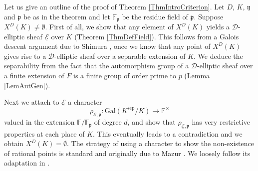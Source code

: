 \documentclass[10pt]{amsart}
\theoremstyle{plain}
\theoremstyle{definition}
\newcommand{\Gal}{\mathrm{Gal}}
\newcommand{\sep}{\mathrm{sep}}
\newcommand{\ucE}{\underline{\mathcal{E}}}
\newcommand{\bF}{\mathbb{F}}
\newcommand{\sD}{\mathscr{D}}
\newcommand{\frp}{\mathfrak{p}}
\newcommand{\fry}{\mathfrak{y}}
\begin{document}

Let us give an outline of the proof of Theorem \ref{ThmIntroCriterion}. 
Let $D$, $K$, $\fry$ and $\frp$ be as in the theorem and let $\bF_\frp$ be the residue field of $\frp$.
Suppose $X^D(K)\neq \emptyset$. 
First of all, we show that 
any element of $X^D(K)$ yields a $\sD$-elliptic sheaf $\ucE$ over $K$ (Theorem 
\ref{ThmDefField}). 
This follows from a Galois descent argument due to Shimura \cite{Shimura}, 
once we know that any point of $X^D(K)$ gives rise to a $\sD$-elliptic sheaf 
over a separable extension of $K$. 
We deduce the separability from the fact that the automorphism group of a 
$\sD$-elliptic sheaf over a finite extension of $F$ is a finite group of order 
prime to $p$ 
(Lemma \ref{LemAutGen}).

Next we attach to $\ucE$ a character 
\[
\rho_{\ucE,\frp}:\Gal(K^\sep/K)\to \bF^\times
\]
valued in the extension $\bF/\bF_\frp$ of degree $d$, and show that $\rho_{\ucE,\frp}$ has very restrictive properties at 
each place
of $K$. This eventually leads to a contradiction and we obtain 
$X^D(K)=\emptyset$. The strategy of using a character to show the non-existence 
of rational points is 
standard and originally due to Mazur \cite{Mazur}. We loosely follow its adaptation in \cite{Jordan}.
\end{document}
